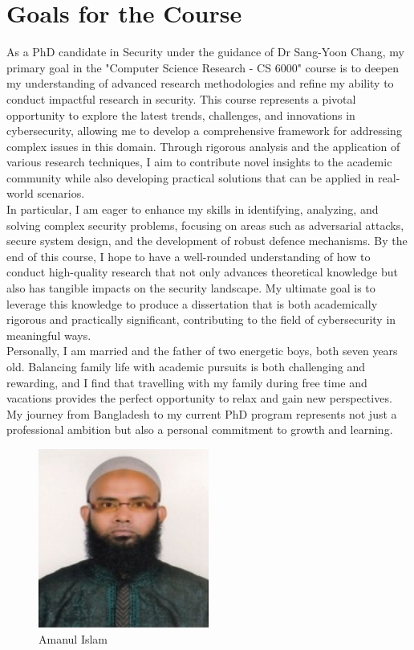\section{Goals for the Course}

As a PhD candidate in Security under the guidance of Dr Sang-Yoon Chang, my primary goal in the "Computer Science Research - CS 6000" course is to deepen my understanding of advanced research methodologies and refine my ability to conduct impactful research in security. This course represents a pivotal opportunity to explore the latest trends, challenges, and innovations in cybersecurity, allowing me to develop a comprehensive framework for addressing complex issues in this domain. Through rigorous analysis and the application of various research techniques, I aim to contribute novel insights to the academic community while also developing practical solutions that can be applied in real-world scenarios.\\

In particular, I am eager to enhance my skills in identifying, analyzing, and solving complex security problems, focusing on areas such as adversarial attacks, secure system design, and the development of robust defence mechanisms. By the end of this course, I hope to have a well-rounded understanding of how to conduct high-quality research that not only advances theoretical knowledge but also has tangible impacts on the security landscape. My ultimate goal is to leverage this knowledge to produce a dissertation that is both academically rigorous and practically significant, contributing to the field of cybersecurity in meaningful ways.\\

Personally, I am married and the father of two energetic boys, both seven years old. Balancing family life with academic pursuits is both challenging and rewarding, and I find that travelling with my family during free time and vacations provides the perfect opportunity to relax and gain new perspectives. My journey from Bangladesh to my current PhD program represents not just a professional ambition but also a personal commitment to growth and learning.

\begin{figure}[h!]
\centering
\includegraphics[width=0.5\textwidth]{images/Amanul_Islam.jpg}
\caption{Amanul Islam}
\label{fig:myphoto}
\end{figure}


